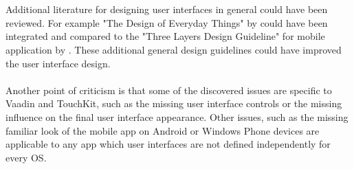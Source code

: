 \\
\\
Additional literature for designing user interfaces in general could have been reviewed. For example "The Design of Everyday Things" by \cite{Norman2002} could have been integrated and compared to the "Three Layers Design Guideline" for mobile application by \cite{AyobNurulZakiahbinti.2009}. These additional general design guidelines could have improved the user interface design.
\\
\\
Another point of criticism is that some of the discovered issues are specific to Vaadin and TouchKit, such as the missing user interface controls or the missing influence on the final user interface appearance. Other issues, such as the missing familiar look of the mobile app on Android or Windows Phone devices are applicable to any app which user interfaces are not defined independently for every OS.